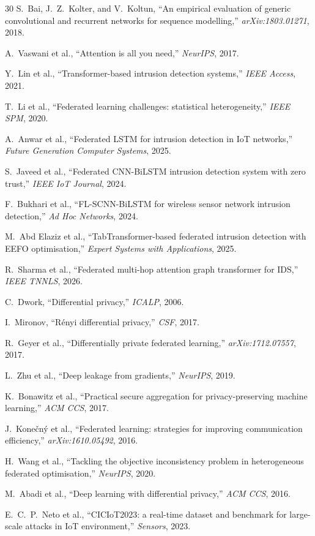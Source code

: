 \documentclass[conference]{IEEEtran}
\begin{document}
\begin{thebibliography}{30}
 S.~Bai, J.~Z.~Kolter, and V.~Koltun, ``An empirical
evaluation of generic convolutional and recurrent networks for
sequence modelling,'' \emph{arXiv:1803.01271}, 2018.

 A.~Vaswani et al., ``Attention is all you
need,'' \emph{NeurIPS}, 2017.

 Y.~Lin et al., ``Transformer-based intrusion
detection systems,'' \emph{IEEE Access}, 2021.

 T.~Li et al., ``Federated learning challenges:
statistical heterogeneity,'' \emph{IEEE SPM}, 2020.

 A.~Anwar et al., ``Federated LSTM for intrusion
detection in IoT networks,''
\emph{Future Generation Computer Systems}, 2025.

 S.~Javeed et al., ``Federated CNN-BiLSTM
intrusion detection system with zero trust,''
\emph{IEEE IoT Journal}, 2024.

 F.~Bukhari et al., ``FL-SCNN-BiLSTM for wireless
sensor network intrusion detection,'' \emph{Ad Hoc Networks}, 2024.

 M.~Abd Elaziz et al., ``TabTransformer-based
federated intrusion detection with EEFO optimisation,''
\emph{Expert Systems with Applications}, 2025.

 R.~Sharma et al., ``Federated multi-hop attention
graph transformer for IDS,'' \emph{IEEE TNNLS}, 2026.

 C.~Dwork, ``Differential privacy,''
\emph{ICALP}, 2006.

 I.~Mironov, ``R\'enyi differential privacy,''
\emph{CSF}, 2017.

 R.~Geyer et al., ``Differentially private
federated learning,'' \emph{arXiv:1712.07557}, 2017.

 L.~Zhu et al., ``Deep leakage from gradients,''
\emph{NeurIPS}, 2019.

 K.~Bonawitz et al., ``Practical secure
aggregation for privacy-preserving machine learning,''
\emph{ACM CCS}, 2017.

 J.~Kone\v{c}n\'y et al., ``Federated learning:
strategies for improving communication efficiency,''
\emph{arXiv:1610.05492}, 2016.

 H.~Wang et al., ``Tackling the objective
inconsistency problem in heterogeneous federated optimisation,''
\emph{NeurIPS}, 2020.

 M.~Abadi et al., ``Deep learning with differential
privacy,'' \emph{ACM CCS}, 2016.

 E.~C.~P.~Neto et al., ``CICIoT2023: a real-time
dataset and benchmark for large-scale attacks in IoT environment,''
\emph{Sensors}, 2023.

\end{thebibliography}
\end{document}
